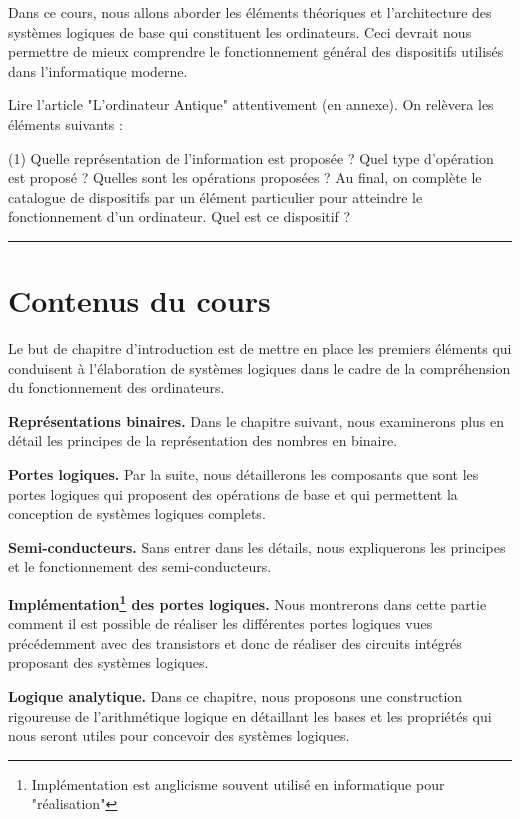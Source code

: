\documentclass[a4paper,11pt]{book}
\begin{document}
Dans ce cours, nous allons aborder les éléments théoriques et l'architecture des systèmes logiques de base qui constituent les ordinateurs. Ceci devrait nous permettre de mieux comprendre le fonctionnement général des dispositifs utilisés dans l'informatique moderne.


\begin{exercise}
    Lire l'article "L'ordinateur Antique" \cite{ordiantique} attentivement (en annexe). On relèvera les éléments suivants :
    \begin{tasks}(1)
        \task Quelle représentation de l'information est proposée ?
        \task Quel type d'opération est proposé ?
        \task Quelles sont les opérations proposées ?
        \task Au final, on complète le catalogue de dispositifs par un élément particulier pour atteindre le fonctionnement d'un ordinateur. Quel est ce dispositif ?
    \end{tasks}
\end{exercise}
\par\noindent\rule{\textwidth}{0.8pt}
\section{Contenus du cours}
Le but de chapitre d'introduction est de mettre en place les premiers éléments qui conduisent à l'élaboration de systèmes logiques dans le cadre de la compréhension du fonctionnement des ordinateurs.

\textbf{Représentations binaires.}
Dans le chapitre suivant, nous examinerons plus en détail les principes de la représentation des nombres en binaire.

\textbf{Portes logiques.}
Par la suite, nous détaillerons les composants que sont les portes logiques qui proposent des opérations de base et qui permettent la conception de systèmes logiques complets.

\textbf{Semi-conducteurs.} Sans entrer dans les détails, nous expliquerons les principes et le fonctionnement des semi-conducteurs.

\textbf{Implémentation\footnote{Implémentation est anglicisme souvent utilisé en informatique pour "réalisation"} des portes logiques.} Nous montrerons dans cette partie comment il est possible de réaliser les différentes portes logiques vues précédemment avec des transistors et donc de réaliser des circuits intégrés proposant des systèmes logiques.

\textbf{Logique analytique.} Dans ce chapitre, nous proposons une construction rigoureuse de l'arithmétique logique en détaillant les bases et les propriétés qui nous seront utiles pour concevoir des systèmes logiques.
\end{document}
